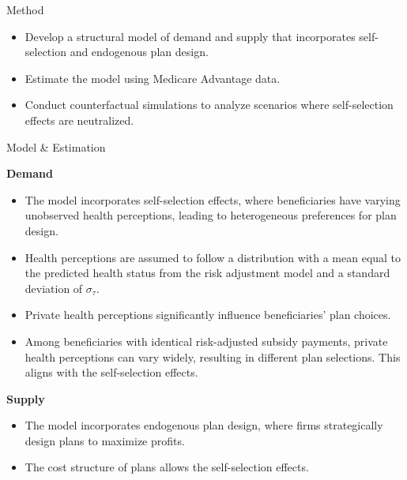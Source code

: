 \documentclass{beamer}
\begin{document}
\begin{frame}[t]
\begin{columns}[t]
\begin{column}{.3\textwidth}
      \begin{block}{Method}
        \begin{itemize}
          \item Develop a structural model of demand and supply that incorporates self-selection and endogenous plan design.
          \item Estimate the model using Medicare Advantage data.
          \item Conduct counterfactual simulations to analyze scenarios where self-selection effects are neutralized.
        \end{itemize}
      \end{block}

      \begin{block}{Model \& Estimation}
      \begin{center}
      \textbf{Demand}
      \begin{itemize}
        \item The model incorporates self-selection effects, where beneficiaries have varying unobserved health perceptions, leading to heterogeneous preferences for plan design.
        \item Health perceptions are assumed to follow a distribution with a mean equal to the predicted health status from the risk adjustment model and a standard deviation of $\sigma_{\tau}$.
      \end{itemize}
      \end{center}
      
      \begin{itemize}
        \item Private health perceptions significantly influence beneficiaries' plan choices.
        \item Among beneficiaries with identical risk-adjusted subsidy payments, private health perceptions can vary widely, resulting in different plan selections. This aligns with the self-selection effects.
      \end{itemize}
    
    \begin{center}
      \textbf{Supply}
    \end{center}

    \begin{itemize}
      \item The model incorporates endogenous plan design, where firms strategically design plans to maximize profits.
      \item The cost structure of plans allows the self-selection effects.
    \end{itemize}
    

\end{block}
\end{column}
\end{columns}
\end{frame}
\end{document}
